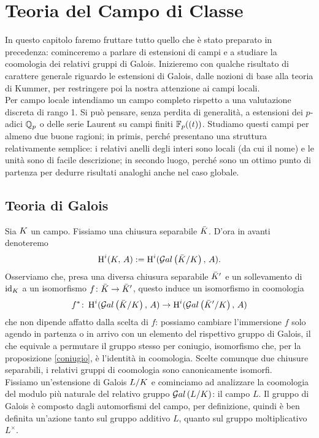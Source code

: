 \chapter{Teoria del Campo di Classe}
In questo capitolo faremo fruttare tutto quello che è stato preparato in precedenza: cominceremo a parlare di estensioni di campi e a studiare la coomologia dei relativi gruppi di Galois. Inizieremo con qualche risultato di carattere generale riguardo le estensioni di Galois, dalle nozioni di base alla teoria di Kummer, per restringere poi la nostra attenzione ai campi locali. \\

Per campo locale intendiamo un campo completo rispetto a una valutazione discreta di rango 1. Si può pensare, senza perdita di generalità, a estensioni dei $ p $-adici $ \mathbb{Q}_p $ o delle serie Laurent su campi finiti $ \mathbb{F}_p((t)) $. Studiamo questi campi per almeno due buone ragioni; in primis, perché presentano una struttura relativamente semplice: i relativi anelli degli interi sono locali (da cui il nome) e le unità sono di facile descrizione; in secondo luogo, perché sono un ottimo punto di partenza per dedurre risultati analoghi anche nel caso globale.



\section{Teoria di Galois}
Sia $ K $ un campo. Fissiamo una chiusura separabile $ \bar{K} $. D'ora in avanti denoteremo
\[ \operatorname{H}^i(K, \, A) := \operatorname{H}^i(\mathcal{G}al\left( \bar{K} / K \right), \, A). \]
Osserviamo che, presa una diversa chiusura separabile $ \bar{K}' $ e un sollevamento di $ \operatorname{id}_{K} $ a un isomorfismo $ f\colon \bar{K} \to \bar{K}' $, questo induce un isomorfismo in coomologia
\[ f^* \colon \operatorname{H}^i(\mathcal{G}al\left( \bar{K} / K \right), \, A) \to \operatorname{H}^i(\mathcal{G}al\left( \bar{K}' / K \right), \, A) \]
che non dipende affatto dalla scelta di $ f $: possiamo cambiare l'immersione $ f $ solo agendo in partenza o in arrivo con un elemento del rispettivo gruppo di Galois, il che equivale a permutare il gruppo stesso per coniugio, isomorfismo che, per la proposizione \ref{coniugio}, è l'identità in coomologia. Scelte comunque due chiusure separabili, i relativi gruppi di coomologia sono canonicamente isomorfi.\\


Fissiamo un'estensione di Galois $ L/K $ e cominciamo ad analizzare la coomologia del modulo più naturale del relativo gruppo $ \mathcal{G}al\left( L/K \right) $: il campo $ L $. Il gruppo di Galois è composto dagli automorfismi del campo, per definizione, quindi è ben definita un'azione tanto sul gruppo additivo $ L $, quanto sul gruppo moltiplicativo $ L^\times $.

